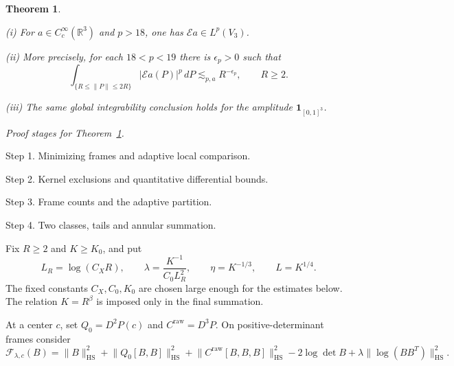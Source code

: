 \documentclass[11pt]{amsart}
\newtheorem{theorem}{Theorem}[section]
\theoremstyle{definition}
\theoremstyle{remark}
\newcommand{\R}{\mathbb R}
\newcommand{\norm}[1]{\lVert #1\rVert}
\newcommand{\abs}[1]{\lvert #1\rvert}
\numberwithin{equation}{section}
\begin{document}
\begin{theorem}\label{low:3:thm:main}\label{low:cubic}

\noindent\textup{(i)} For $a\in C_c^\infty(\R^3)$ and $p>18$, one has $\mathcal E a\in L^p(V_{3})$.

\noindent\textup{(ii)} More precisely, for each $18<p<19$ there is $\epsilon_p>0$ such that
\begin{equation}\label{low:3:eq:annular-main}
\int_{\{R\leq\norm P\leq2R\}}\abs{\mathcal E a(P)}^p\,dP\lesssim_{p,a} R^{-\epsilon_p},\qquad R\geq2.
\end{equation}

\noindent\textup{(iii)} The same global integrability conclusion holds for the amplitude $\mathbf 1_{[0,1]^3}$.
\end{theorem}

\par\smallskip
\noindent\textit{Proof stages for Theorem~\ref{low:3:thm:main}.}\par\nobreak
\noindent\textup{Step 1.} Minimizing frames and adaptive local comparison.\par\nobreak
\noindent\textup{Step 2.} Kernel exclusions and quantitative differential bounds.\par\nobreak
\noindent\textup{Step 3.} Frame counts and the adaptive partition.\par\nobreak
\noindent\textup{Step 4.} Two classes, tails and annular summation.\par\nobreak
\smallskip

Fix $R\geq2$ and $K\geq K_0$, and put
\begin{equation}\label{low:3:eq:parameters}
L_R=\log(C_XR),\qquad \lambda=\frac{K^{-1}}{C_0L_R^2},\qquad \eta=K^{-1/3},\qquad L=K^{1/4}.
\end{equation}
The fixed constants $C_X,C_0,K_0$ are chosen large enough for the estimates below. The relation $K=R^\beta$ is imposed only in the final summation.

At a center $c$, set $Q_0=D^2P(c)$ and $C^{\mathrm{raw}}=D^3P$. On positive-determinant frames consider
\begin{equation}\label{low:3:eq:functional}
\mathcal F_{\lambda,c}(B)=\norm B_{\mathrm{HS}}^2+\norm{Q_0[B,B]}_{\mathrm{HS}}^2+\norm{C^{\mathrm{raw}}[B,B,B]}_{\mathrm{HS}}^2-2\log\det B+\lambda\norm{\log(BB^T)}_{\mathrm{HS}}^2.
\end{equation}
\end{document}
